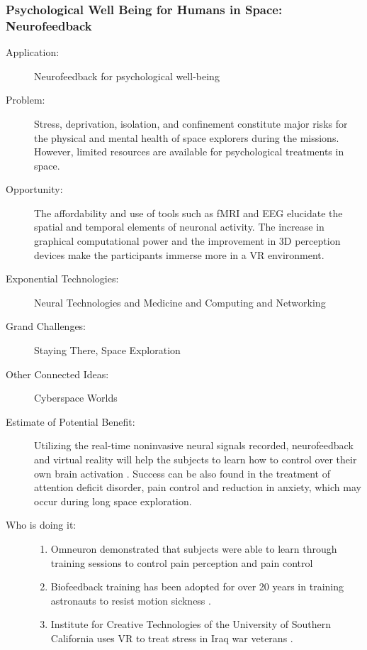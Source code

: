 \subsubsection{Psychological Well Being for Humans in Space: Neurofeedback}
\begin{description}   \item[Application:] Neurofeedback for psychological well-being
 
\item[Problem:] Stress,   deprivation, isolation, and confinement constitute major risks for the   physical and mental health of space explorers during the missions. However, limited resources are available for psychological   treatments in space.
 
\item[Opportunity:] The   affordability and use of tools such as \gls{fMRI} and \gls{EEG} elucidate the spatial   and temporal elements of neuronal activity. The increase in graphical   computational power and the improvement in 3D perception devices make  the participants immerse more in a \gls{VR} environment.
 
\item[Exponential Technologies:]   Neural Technologies and Medicine and Computing and Networking
 
\item[Grand Challenges:] Staying There, Space Exploration
 
\item[Other Connected Ideas:]   Cyberspace Worlds
 
\item[Estimate of Potential   Benefit:] Utilizing the real-time noninvasive neural signals recorded,   neurofeedback and virtual reality will help the subjects to learn how  to  control over their own brain activation \cite{deCharms2008}.  Success  can be also found in the treatment of attention deficit  disorder, pain  control and reduction in anxiety, which may occur during  long space  exploration.
 
\item[Who is doing it:] 
\hfill\begin{enumerate}
\item Omneuron demonstrated that   subjects were able to learn through training sessions to control pain   perception and pain control \cite{deCharms2008}
\item  Biofeedback training has   been adopted for over 20 years in training astronauts to resist motion  sickness \cite{Clement2008}.
\item Institute for Creative   Technologies of the University of Southern California uses VR to treat stress in Iraq war veterans \cite{Sutliff2005}. 
\end{enumerate}
 

\end{description}
